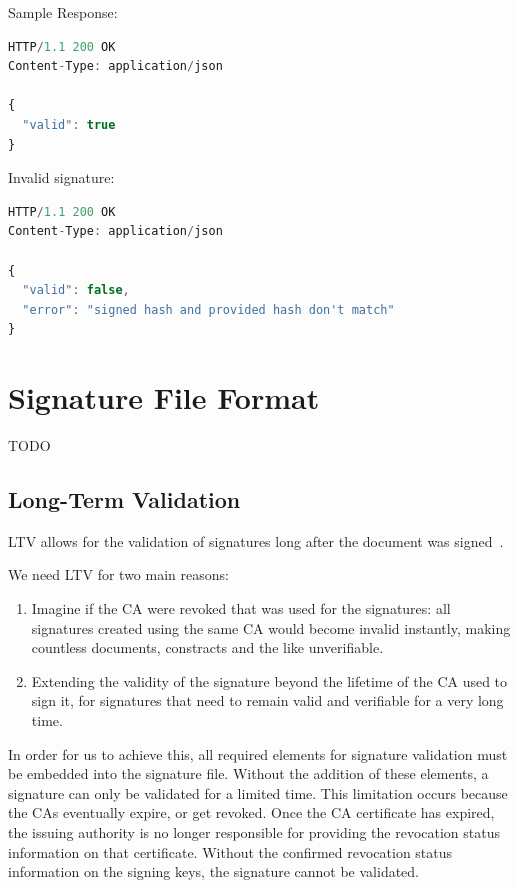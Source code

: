 Sample Response:

\begin{lstlisting}[caption={sign response}, captionpos=b, language=JavaScript, label={lst:verifyresponse}]
HTTP/1.1 200 OK
Content-Type: application/json

{
  "valid": true
}
\end{lstlisting}

Invalid signature:

\begin{lstlisting}[caption={sign response}, captionpos=b, language=JavaScript, label={lst:verifyresponsefailed}]
HTTP/1.1 200 OK
Content-Type: application/json

{
  "valid": false,
  "error": "signed hash and provided hash don't match"
}
\end{lstlisting}

\section{Signature File Format}
TODO
\subsection{Long-Term Validation}
\gls{LTV} allows for the validation of signatures long after the document was signed~\cite{etsipades}.

We need \gls{LTV} for two main reasons:
\begin{enumerate}
    \item Imagine if the \gls{CA} were revoked that was used for the signatures: all signatures created using the same \gls{CA} would become invalid instantly, making countless documents, constracts and the like unverifiable.
    \item Extending the validity of the signature beyond the lifetime of the \gls{CA} used to sign it, for signatures that need to remain valid and verifiable for a very long time.
\end{enumerate}
In order for us to achieve this, all required elements for signature validation must be embedded into the signature file.
Without the addition of these elements, a signature can only be validated for a limited time.
This limitation occurs because the \gls{CA}s eventually expire, or get revoked.
Once the \gls{CA} certificate has expired, the issuing authority is no longer responsible for providing the revocation status information on that certificate.
Without the confirmed revocation status information on the signing keys, the signature cannot be validated.

